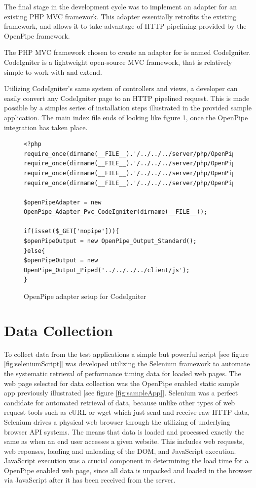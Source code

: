\documentclass[12pt]{report}
\begin{document}
The final stage in the development cycle was to implement an adapter for an existing PHP MVC framework. This adapter essentially retrofits the existing framework, and allows it to take advantage of HTTP pipelining provided by the OpenPipe framework. 

The PHP MVC framework chosen to create an adapter for is named CodeIgniter. CodeIgniter is a lightweight open-source MVC framework, that is relatively simple to work with and extend. 

Utilizing CodeIgniter’s same system of controllers and views, a developer can easily convert any CodeIgniter page to an HTTP pipelined request. This is made possible by a simples series of installation steps illustrated in the provided sample application. The main index file ends of looking like figure \ref{fig:codeIgniterPvcCode}, once the OpenPipe integration has taken place.

\begin{figure}[H]
\label{fig:codeIgniterPvcCode}
\begin{lstlisting}
<?php
require_once(dirname(__FILE__).'/../../../server/php/OpenPipe/Adapter/Pvc/CodeIgniter.php');
require_once(dirname(__FILE__).'/../../../server/php/OpenPipe/Output/Piped.php');
require_once(dirname(__FILE__).'/../../../server/php/OpenPipe/Output/Standard.php');
require_once(dirname(__FILE__).'/../../../server/php/OpenPipe/Runner.php');

$openPipeAdapter = new OpenPipe_Adapter_Pvc_CodeIgniter(dirname(__FILE__));

if(isset($_GET['nopipe'])){
$openPipeOutput = new OpenPipe_Output_Standard();	
}else{
$openPipeOutput = new OpenPipe_Output_Piped('../../../../client/js');	
}
\end{lstlisting}
\caption{OpenPipe adapter setup for CodeIgniter}
\end{figure}


\section{Data Collection}

To collect data from the test applications a simple but powerful script [see figure \ref{fig:seleniumScript}] was developed utilizing the Selenium framework to automate the systematic retrieval of performance timing data for loaded web pages. The web page selected for data collection was the OpenPipe enabled static sample app previously illustrated [see figure \ref{fig:sampleApp}].  Selenium was a perfect candidate for automated retrieval of data, because unlike other types of web request tools such as cURL or wget which just send and receive raw HTTP data, Selenium drives a physical web browser through the utilizing of underlying browser API systems. The means that data is loaded and processed exactly the same as when an end user accesses a given website. This includes web requests, web reponses,  loading and unloading of the DOM,  and JavaScript execution. JavaScript execution was a crucial component in determining the load time for a OpenPipe enabled web page, since all data is unpacked and loaded in the browser via JavaScript after it has been received from the server.
\end{document}
